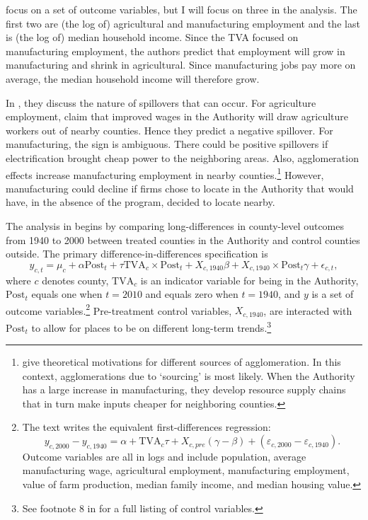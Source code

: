 \documentclass[11pt]{article}
\begin{document}
\citet{Kline_Moretti_2014} focus on a set of outcome variables, but I will focus on three in the analysis. The first two are (the log of) agricultural and manufacturing employment and the last is (the log of) median household income. Since the TVA focused on manufacturing employment, the authors predict that employment will grow in manufacturing and shrink in agricultural. Since manufacturing jobs pay more on average, the median household income will therefore grow. 

In \citet{Kline_Moretti_2014}, they discuss the nature of spillovers that can occur. For agriculture employment, \citet{Kline_Moretti_2014} claim that improved wages in the Authority will draw agriculture workers out of nearby counties. Hence they predict a negative spillover. For manufacturing, the sign is ambiguous. There could be positive spillovers if electrification brought cheap power to the neighboring areas. Also, agglomeration effects increase manufacturing employment in nearby counties.\footnote{\citet{Duranton_Puga_2003} give theoretical motivations for different sources of agglomeration. In this context, agglomerations due to `sourcing' is most likely. When the Authority has a large increase in manufacturing, they develop resource supply chains that in turn make inputs cheaper for neighboring counties.} However, manufacturing could decline if firms chose to locate in the Authority that would have, in the absence of the program, decided to locate nearby. 

The analysis in \citet{Kline_Moretti_2014} begins by comparing long-differences in county-level outcomes from 1940 to 2000 between treated counties in the Authority and control counties outside. The primary difference-in-differences specification is
\begin{equation}\label{eq:tva}
    y_{c, t} = \mu_c + \alpha \text{Post}_t + \tau \text{TVA}_c \times \text{Post}_t + X_{c, 1940} \beta + X_{c, 1940} \times \text{Post}_t \gamma + \epsilon_{c,t},
\end{equation}
where $c$ denotes county, $\text{TVA}_c$ is an indicator variable for being in the Authority, $\text{Post}_t$ equals one when $t = 2010$ and equals zero when $t = 1940$, and $y$ is a set of outcome variables.\footnote{The text writes the equivalent first-differences regression: \[ 
    y_{c, 2000} - y_{c, 1940} = \alpha + \text{TVA}_c \tau + X_{c, pre} (\gamma - \beta) + (\varepsilon_{c, 2000} - \varepsilon_{c, 1940}). 
\] Outcome variables are all in logs and include population, average manufacturing wage, agricultural employment, manufacturing employment, value of farm production, median family income, and median housing value.} Pre-treatment control variables, $X_{c,1940}$, are interacted with $\text{Post}_t$ to allow for places to be on different long-term trends.\footnote{See footnote 8 in \citet{Kline_Moretti_2014} for a full listing of control variables.} 
\end{document}
